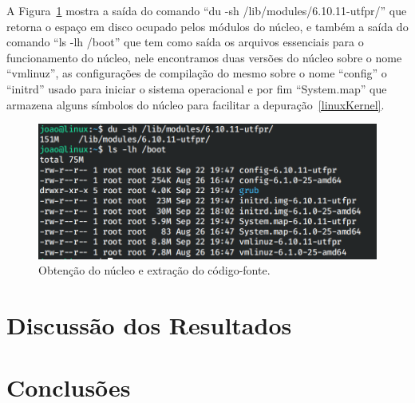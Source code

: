 \documentclass[
	12pt,				%
	oneside,   	        %
	a4paper,			%
	english,			%
	french,				%
	spanish,			%
	brazil,				%
	]{pacotes/abntex2}
\begin{document}
A Figura~\ref{fig:boot} mostra a saída do comando ``du -sh /lib/modules/6.10.11-utfpr/'' que retorna o espaço em disco ocupado pelos módulos do núcleo, e também a saída do comando ``ls -lh /boot'' que tem como saída os arquivos essenciais para o funcionamento do núcleo, nele encontramos duas versões do núcleo sobre o nome ``vmlinuz'', as configurações de compilação do mesmo sobre o nome ``config'' o ``initrd'' usado para iniciar o sistema operacional e por fim ``System.map'' que armazena alguns símbolos do núcleo para facilitar a depuração~\ref{linuxKernel}.

\begin{figure}[H]
  \centering
  \includegraphics[scale=0.3]{figuras/boot.png}
  \caption{Obtenção do núcleo e extração do código-fonte.}
  \label{fig:boot}
\end{figure}



\section{Discussão dos Resultados}
\label{sec:discussao}

\section{Conclusões}
\label{sec:conclusoes}

\postextual
\renewcommand{\bibsection}{%
\section{\bibname}
\bibmark
\prebibhook}
\end{document}
